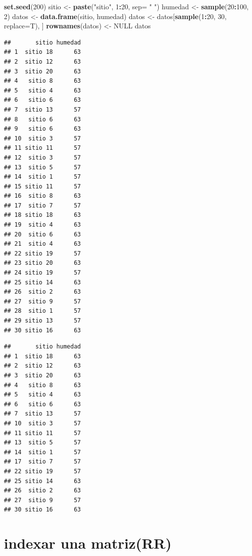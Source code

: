 \documentclass[]{book}
\newenvironment{Shaded}{\begin{snugshade}}{\end{snugshade}}
\newcommand{\DataTypeTok}[1]{\textcolor[rgb]{0.13,0.29,0.53}{#1}}
\newcommand{\DecValTok}[1]{\textcolor[rgb]{0.00,0.00,0.81}{#1}}
\newcommand{\KeywordTok}[1]{\textcolor[rgb]{0.13,0.29,0.53}{\textbf{#1}}}
\newcommand{\NormalTok}[1]{#1}
\newcommand{\OperatorTok}[1]{\textcolor[rgb]{0.81,0.36,0.00}{\textbf{#1}}}
\newcommand{\OtherTok}[1]{\textcolor[rgb]{0.56,0.35,0.01}{#1}}
\newcommand{\StringTok}[1]{\textcolor[rgb]{0.31,0.60,0.02}{#1}}
\begin{document}
\begin{Shaded}
\begin{Highlighting}[]
\KeywordTok{set.seed}\NormalTok{(}\DecValTok{200}\NormalTok{)}
\NormalTok{sitio <-}\StringTok{  }\KeywordTok{paste}\NormalTok{(}\StringTok{"sitio"}\NormalTok{, }\DecValTok{1}\OperatorTok{:}\DecValTok{20}\NormalTok{, }\DataTypeTok{sep=} \StringTok{" "}\NormalTok{)}
\NormalTok{humedad <-}\StringTok{ }\KeywordTok{sample}\NormalTok{(}\DecValTok{20}\OperatorTok{:}\DecValTok{100}\NormalTok{, }\DecValTok{2}\NormalTok{)}
\NormalTok{datos <-}\StringTok{ }\KeywordTok{data.frame}\NormalTok{(sitio, humedad)}
\NormalTok{datos <-}\StringTok{ }\NormalTok{datos[}\KeywordTok{sample}\NormalTok{(}\DecValTok{1}\OperatorTok{:}\DecValTok{20}\NormalTok{, }\DecValTok{30}\NormalTok{, }\DataTypeTok{replace=}\NormalTok{T), ]}
\KeywordTok{rownames}\NormalTok{(datos) <-}\StringTok{ }\OtherTok{NULL}
\NormalTok{datos}
\end{Highlighting}
\end{Shaded}

\begin{verbatim}
##       sitio humedad
## 1  sitio 18      63
## 2  sitio 12      63
## 3  sitio 20      63
## 4   sitio 8      63
## 5   sitio 4      63
## 6   sitio 6      63
## 7  sitio 13      57
## 8   sitio 6      63
## 9   sitio 6      63
## 10  sitio 3      57
## 11 sitio 11      57
## 12  sitio 3      57
## 13  sitio 5      57
## 14  sitio 1      57
## 15 sitio 11      57
## 16  sitio 8      63
## 17  sitio 7      57
## 18 sitio 18      63
## 19  sitio 4      63
## 20  sitio 6      63
## 21  sitio 4      63
## 22 sitio 19      57
## 23 sitio 20      63
## 24 sitio 19      57
## 25 sitio 14      63
## 26  sitio 2      63
## 27  sitio 9      57
## 28  sitio 1      57
## 29 sitio 13      57
## 30 sitio 16      63
\end{verbatim}

\begin{verbatim}
##       sitio humedad
## 1  sitio 18      63
## 2  sitio 12      63
## 3  sitio 20      63
## 4   sitio 8      63
## 5   sitio 4      63
## 6   sitio 6      63
## 7  sitio 13      57
## 10  sitio 3      57
## 11 sitio 11      57
## 13  sitio 5      57
## 14  sitio 1      57
## 17  sitio 7      57
## 22 sitio 19      57
## 25 sitio 14      63
## 26  sitio 2      63
## 27  sitio 9      57
## 30 sitio 16      63
\end{verbatim}

\hypertarget{indexar-una-matrizrr}{%
\section{indexar una matriz(RR)}\label{indexar-una-matrizrr}}
\end{document}

